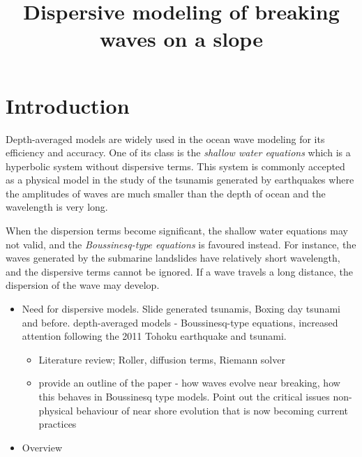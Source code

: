 \documentclass[review]{elsarticle}
\begin{document}
\begin{frontmatter}

\title{Dispersive modeling of breaking waves  on a slope}

\author{}
\address{}

\begin{abstract}

\end{abstract}

\begin{keyword}

\end{keyword}

\end{frontmatter}

\linenumbers

\section{Introduction}

\iffalse

Depth-averaged models are widely used
in the ocean wave modeling for its efficiency and accuracy. 
One of its class is the {\em shallow water equations}
which is a hyperbolic system without dispersive terms. 
This system is commonly accepted as a physical model
in the study of the tsunamis generated by earthquakes
where the amplitudes of waves are much smaller than the depth of ocean and the wavelength is very long. 

When the dispersion terms become significant,
the shallow water equations may not valid,
and the {\em Boussinesq-type equations} is favoured instead.
For instance, the waves generated by the submarine landslides
have relatively short wavelength,
and the dispersive terms cannot be ignored. 
If a wave travels a long distance, 
the dispersion of the wave may develop.  

\begin{itemize}
    \item Need for dispersive models. Slide generated tsunamis, Boxing day tsunami and before. depth-averaged models - Boussinesq-type equations, increased attention following the 2011 Tohoku earthquake and tsunami.
    \begin{itemize}
        \item Literature review; Roller, diffusion terms, Riemann solver
        \item provide an outline of the paper - how waves evolve near breaking, how this behaves in Boussinesq type models. Point out the critical issues non-physical behaviour of near shore evolution that is now becoming current practices
    \end{itemize}
    \item Overview 
\end{itemize}
\end{document}
